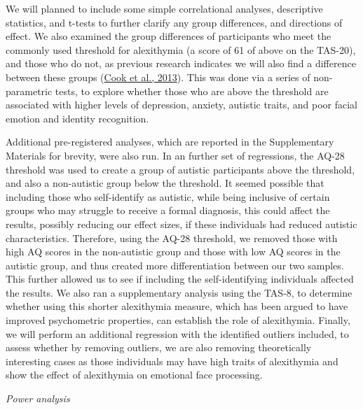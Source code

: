 \documentclass[
]{article}
\begin{document}
We will planned to include some simple correlational analyses, descriptive statistics, and t-tests to further clarify any group differences, and directions of effect. We also examined the group differences of participants who meet the commonly used threshold for alexithymia (a score of 61 of above on the TAS-20), and those who do not, as previous research indicates we will also find a difference between these groups (\protect\hyperlink{ref-cook2013a}{Cook et al., 2013}). This was done via a series of non-parametric tests, to explore whether those who are above the threshold are associated with higher levels of depression, anxiety, autistic traits, and poor facial emotion and identity recognition.

Additional pre-registered analyses, which are reported in the Supplementary Materials for brevity, were also run. In an further set of regressions, the AQ-28 threshold was used to create a group of autistic participants above the threshold, and also a non-autistic group below the threshold. It seemed possible that including those who self-identify as autistic, while being inclusive of certain groups who may struggle to receive a formal diagnosis, this could affect the results, possibly reducing our effect sizes, if these individuals had reduced autistic characteristics. Therefore, using the AQ-28 threshold, we removed those with high AQ scores in the non-autistic group and those with low AQ scores in the autistic group, and thus created more differentiation between our two samples. This further allowed us to see if including the self-identifying individuals affected the results. We also ran a supplementary analysis using the TAS-8, to determine whether using this shorter alexithymia measure, which has been argued to have improved psychometric properties, can establish the role of alexithymia. Finally, we will perform an additional regression with the identified outliers included, to assess whether by removing outliers, we are also removing theoretically interesting cases as those individuals may have high traits of alexithymia and show the effect of alexithymia on emotional face processing.

\emph{Power analysis}
\end{document}
